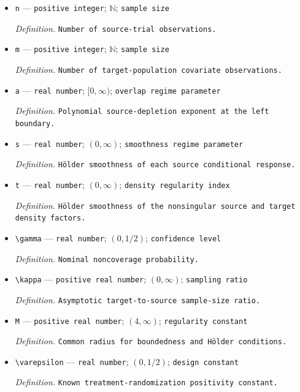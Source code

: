 \documentclass{article}
\begin{document}
\begin{itemize}
  \item \texttt{n} --- \texttt{positive integer}; \(\mathbb N\); \texttt{sample size}
  \par\smallskip\noindent\emph{Definition.} \texttt{Number of source-\allowbreak{}trial observations.}
  \item \texttt{m} --- \texttt{positive integer}; \(\mathbb N\); \texttt{sample size}
  \par\smallskip\noindent\emph{Definition.} \texttt{Number of target-\allowbreak{}population covariate observations.}
  \item \texttt{a} --- \texttt{real number}; \([0,\infty)\); \texttt{overlap regime parameter}
  \par\smallskip\noindent\emph{Definition.} \texttt{Polynomial source-\allowbreak{}depletion exponent at the left boundary.}
  \item \texttt{s} --- \texttt{real number}; \((0,\infty)\); \texttt{smoothness regime parameter}
  \par\smallskip\noindent\emph{Definition.} \texttt{Hölder smoothness of each source conditional response.}
  \item \texttt{t} --- \texttt{real number}; \((0,\infty)\); \texttt{density regularity index}
  \par\smallskip\noindent\emph{Definition.} \texttt{Hölder smoothness of the nonsingular source and target density factors.}
  \item \texttt{\textbackslash{}\allowbreak{}gamma} --- \texttt{real number}; \((0,1/2)\); \texttt{confidence level}
  \par\smallskip\noindent\emph{Definition.} \texttt{Nominal noncoverage probability.}
  \item \texttt{\textbackslash{}\allowbreak{}kappa} --- \texttt{positive real number}; \((0,\infty)\); \texttt{sampling ratio}
  \par\smallskip\noindent\emph{Definition.} \texttt{Asymptotic target-\allowbreak{}to-\allowbreak{}source sample-\allowbreak{}size ratio.}
  \item \texttt{M} --- \texttt{positive real number}; \((4,\infty)\); \texttt{regularity constant}
  \par\smallskip\noindent\emph{Definition.} \texttt{Common radius for boundedness and Hölder conditions.}
  \item \texttt{\textbackslash{}\allowbreak{}varepsilon} --- \texttt{real number}; \((0,1/2)\); \texttt{design constant}
  \par\smallskip\noindent\emph{Definition.} \texttt{Known treatment-\allowbreak{}randomization positivity constant.}

\end{itemize}
\end{document}
